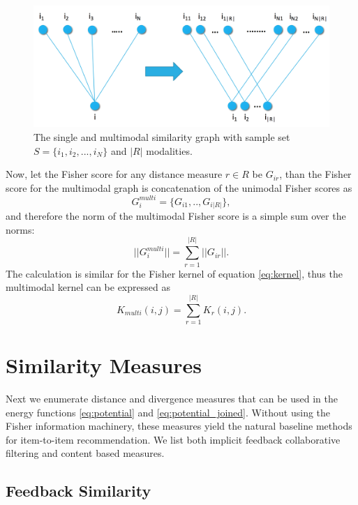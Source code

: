 \begin{figure}
\centerline{
\includegraphics[scale=.2]{i2i_multi.png}}
\caption{The single and multimodal similarity graph with sample set $S=\{i_1,i_2,...,i_{N}\}$ and $|R|$ modalities.}
\label{fig:multi}
\end{figure}

Now, let the Fisher score for any distance measure $r \in R$ be $G_{ir}$, than the Fisher score for the multimodal graph is concatenation of the unimodal Fisher scores as
%
\begin{equation}
G_i^{multi} = \{G_{i1},..,G_{i|R|}\},
\nonumber
\end{equation}
%
and therefore the norm of the multimodal Fisher score is a simple sum over the norms: 
%
\begin{equation}
|| G_i^{multi}|| = \sum_{r=1}^{|R|} ||G_{ir}||.
\label{eq:fs_multi}
\end{equation}
%
The calculation is similar for the Fisher kernel of equation \eqref{eq:kernel}, thus the multimodal kernel can be expressed as
%
\begin{equation}
K_{multi}(i,j) = \sum_{r=1}^{|R|} K_r(i,j).
\label{eq:fk_multi}
\end{equation}

\section{Similarity Measures}
\label{sec:sims}
Next we enumerate distance and divergence measures that can be used in the energy functions \eqref{eq:potential} and \eqref{eq:potential_joined}. 
Without using the Fisher information machinery, these measures yield the natural baseline methods for item-to-item recommendation.
We list both implicit feedback collaborative filtering and content based measures.

\subsection{Feedback Similarity}

